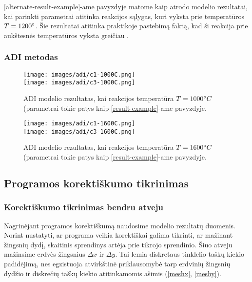 \ref{alternate-result-example}-ame pavyzdyje matome kaip atrodo modelio rezultatai, kai parinkti parametrai atitinka reakcijos sąlygas, kuri vyksta prie temperatūros $T=1200\degree$. Šie rezultatai atitinka praktikoje pastebimą faktą, kad ši reakcija prie aukštesnės temperatūros vyksta greičiau \cite{ivanauskasComputationalModellingYAG2009}. 

\subsubsection{ADI metodas}

\begin{figure}[h!]
  \centering
  \texttt{[image: images/adi/c1-1000C.png]} \\ 
  \texttt{[image: images/adi/c3-1000C.png]}
  
  \caption{ADI modelio rezultatas, kai reakcijos temperatūra $T=1000\degree C$ (parametrai tokie patys kaip \ref{result-example}-ame pavyzdyje.}
  
  \label{fig:adi-result-T-1000}
\end{figure}

\begin{figure}[h!]
    \centering
    \texttt{[image: images/adi/c1-1600C.png]} \\ 
    \texttt{[image: images/adi/c3-1600C.png]}
    
    \caption{ADI modelio rezultatas, kai reakcijos temperatūra $T=1600\degree C$ (parametrai tokie patys kaip \ref{result-example}-ame pavyzdyje.}
    
    \label{fig:adi-result-T-1600}
  \end{figure}

\subsection{Programos korektiškumo tikrinimas}

\subsubsection*{Korektiškumo tikrinimas bendru atveju}

Nagrinėjant programos korektiškumą naudosime modelio rezultatų duomenis. 
Norint nustatyti, ar programa veikia korektiškai galima tikrinti, ar mažinant žingsnių dydį, skaitinis sprendinys artėja prie tikrojo sprendinio. Šiuo atveju mažinsime erdvės žingsnius $\Delta x$ ir $\Delta y$. Tai lemia diskretaus tinklelio taškų kiekio padidėjimą, nes egzistuoja atvirkštinė priklausomybė tarp erdvinių žingsnių dydžio ir diskrečių taškų kiekio atitinkamomis ašimis (\ref{meshx}, \ref{meshy}).

